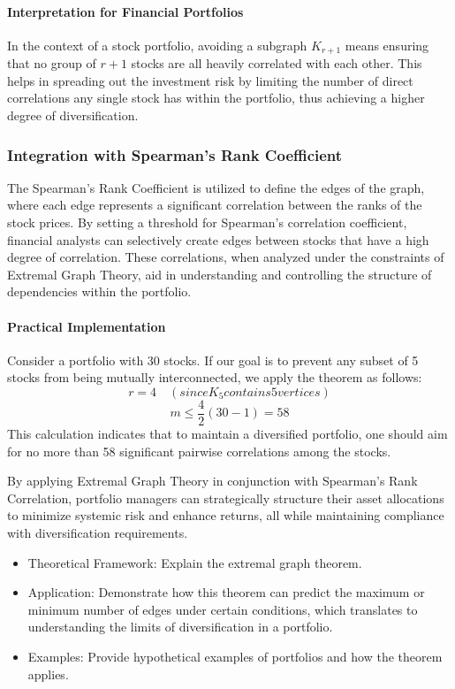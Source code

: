 \documentclass{article}
\begin{document}
\paragraph{Interpretation for Financial Portfolios}
In the context of a stock portfolio, avoiding a subgraph $K_{r+1}$ means ensuring that no group of $r+1$ stocks are all heavily correlated with each other. This helps in spreading out the investment risk by limiting the number of direct correlations any single stock has within the portfolio, thus achieving a higher degree of diversification.

\subsubsection{Integration with Spearman's Rank Coefficient}

The Spearman's Rank Coefficient is utilized to define the edges of the graph, where each edge represents a significant correlation between the ranks of the stock prices. By setting a threshold for Spearman's correlation coefficient, financial analysts can selectively create edges between stocks that have a high degree of correlation. These correlations, when analyzed under the constraints of Extremal Graph Theory, aid in understanding and controlling the structure of dependencies within the portfolio.

\paragraph{Practical Implementation}
Consider a portfolio with 30 stocks. If our goal is to prevent any subset of 5 stocks from being mutually interconnected, we apply the theorem as follows:
\[
r = 4 \quad ({since } K_5 {contains 5 vertices})
\]
\[
m \leq \frac{4}{2} (30-1) = 58
\]
This calculation indicates that to maintain a diversified portfolio, one should aim for no more than 58 significant pairwise correlations among the stocks.

By applying Extremal Graph Theory in conjunction with Spearman's Rank Correlation, portfolio managers can strategically structure their asset allocations to minimize systemic risk and enhance returns, all while maintaining compliance with diversification requirements.

\begin{itemize}
    \item Theoretical Framework: Explain the extremal graph theorem.
    \item Application: Demonstrate how this theorem can predict the maximum or minimum number of edges under certain conditions, which translates to understanding the limits of diversification in a portfolio.
    \item Examples: Provide hypothetical examples of portfolios and how the theorem applies.
\end{itemize}
\end{document}
